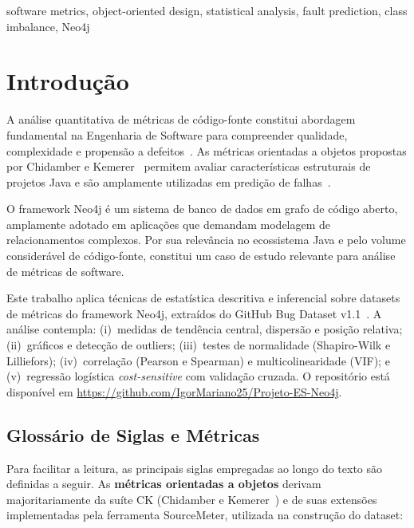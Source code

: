\documentclass[conference]{IEEEtran}
\begin{document}
\begin{IEEEkeywords}
software metrics, object-oriented design, statistical analysis, fault prediction, class imbalance, Neo4j
\end{IEEEkeywords}

\section{Introdução}\label{sec:intro}

A análise quantitativa de métricas de código-fonte constitui abordagem fundamental na Engenharia de Software para compreender qualidade, complexidade e propensão a defeitos~\cite{pressman2014}. As métricas orientadas a objetos propostas por Chidamber e Kemerer~\cite{chidamber1994} permitem avaliar características estruturais de projetos Java e são amplamente utilizadas em predição de falhas~\cite{gyimothy2005,basili1996}.

O framework Neo4j é um sistema de banco de dados em grafo de código aberto, amplamente adotado em aplicações que demandam modelagem de relacionamentos complexos. Por sua relevância no ecossistema Java e pelo volume considerável de código-fonte, constitui um caso de estudo relevante para análise de métricas de software.

Este trabalho aplica técnicas de estatística descritiva e inferencial sobre datasets de métricas do framework Neo4j, extraídos do GitHub Bug Dataset v1.1~\cite{toth2016}. A análise contempla: (i)~medidas de tendência central, dispersão e posição relativa; (ii)~gráficos e detecção de outliers; (iii)~testes de normalidade (Shapiro-Wilk e Lilliefors); (iv)~correlação (Pearson e Spearman) e multicolinearidade (VIF); e (v)~regressão logística \textit{cost-sensitive} com validação cruzada. O repositório está disponível em \url{https://github.com/IgorMariano25/Projeto-ES-Neo4j}.

\subsection{Glossário de Siglas e Métricas}\label{sec:siglas}

Para facilitar a leitura, as principais siglas empregadas ao longo do texto são definidas a seguir. As \textbf{métricas orientadas a objetos} derivam majoritariamente da suíte CK (Chidamber e Kemerer~\cite{chidamber1994}) e de suas extensões implementadas pela ferramenta SourceMeter, utilizada na construção do dataset:
\end{document}
